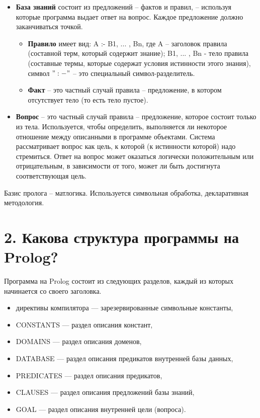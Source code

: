 \documentclass[12pt]{report}
\begin{document}
\begin{itemize}
	\item \textbf{База знаний} состоит из предложений -- фактов и правил, -- используя которые программа выдает ответ на вопрос. Каждое предложение  должно заканчиваться точкой.
	\begin{itemize}
		\item \textbf{Правило} имеет вид: A :- B1, ... , Bn, где A -- заголовок правила (составной терм, который содержит знание); B1, ... , Bn - тело правила (составные термы, которые содержат условия истинности этого знания), символ $":-"$ -- это специальный символ-разделитель.
		\item \textbf{Факт} -- это частный случай правила -- предложение, в котором отсутствует тело (то есть тело пустое).
	\end{itemize}
	\item \textbf{Вопрос} -- это частный случай правила -- предложение, которое состоит только из тела. Используется, чтобы определить, выполняется ли некоторое отношение между описанными в программе объектами. Система рассматривает вопрос как цель, к которой (к истинности которой) надо стремиться. Ответ на вопрос может оказаться логически положительным или отрицательным, в зависимости от того, может ли быть достигнута соответствующая цель.
\end{itemize}

Базис пролога -- матлогика. Используется символьная обработка,  декларативная методология.

\section*{2. Какова структура программы на Prolog?}

Программа на Prolog состоит из следующих разделов, каждый из которых начинается со своего заголовка.

\begin{itemize}
	\item директивы компилятора — зарезервированные символьные константы,
	\item CONSTANTS — раздел описания констант,
	\item DOMAINS — раздел описания доменов,
	\item DATABASE — раздел описания предикатов внутренней базы данных,
	\item PREDICATES — раздел описания предикатов,
	\item CLAUSES — раздел описания предложений базы знаний,
	\item GOAL — раздел описания внутренней цели (вопроса).
\end{itemize}
\end{document}
